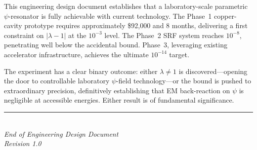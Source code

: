 \documentclass[12pt,letterpaper]{article}
\begin{document}
This engineering design document establishes that a laboratory-scale
parametric $\psi$-resonator is fully achievable with current technology.
The Phase~1 copper-cavity prototype requires approximately \$92,000 and
8 months, delivering a first constraint on $|\lambda - 1|$ at the
$10^{-3}$ level.  The Phase~2 SRF system reaches $10^{-8}$, penetrating
well below the accidental bound.  Phase~3, leveraging existing
accelerator infrastructure, achieves the ultimate $10^{-14}$ target.

The experiment has a clear binary outcome: either $\lambda \neq 1$ is
discovered---opening the door to controllable laboratory $\psi$-field
technology---or the bound is pushed to extraordinary precision,
definitively establishing that EM back-reaction on $\psi$ is negligible
at accessible energies.  Either result is of fundamental significance.

\vfill
\begin{center}
\rule{0.5\textwidth}{0.4pt}\\[6pt]
\textit{End of Engineering Design Document}\\
\textit{Revision 1.0}
\end{center}
\end{document}
